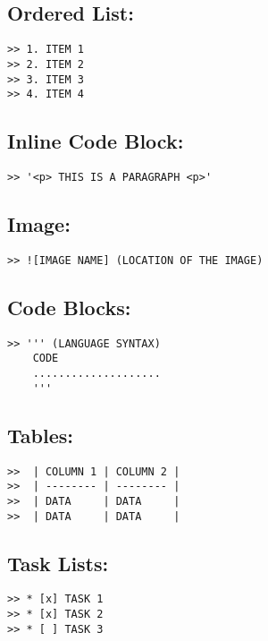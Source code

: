 \documentclass[british]{article}
\begin{document}
\subsection{Ordered List:}
\begin{verbatim}
>> 1. ITEM 1
>> 2. ITEM 2
>> 3. ITEM 3
>> 4. ITEM 4
\end{verbatim}

\subsection{Inline Code Block:}
\begin{verbatim}
>> '<p> THIS IS A PARAGRAPH <p>'
\end{verbatim}

\subsection{Image:}
\begin{verbatim}
>> ![IMAGE NAME] (LOCATION OF THE IMAGE)
\end{verbatim}

\subsection{Code Blocks:}
\begin{verbatim}
>> ''' (LANGUAGE SYNTAX)
	CODE 
	....................
	'''
\end{verbatim}

\subsection{Tables:}
\begin{verbatim}
>>  | COLUMN 1 | COLUMN 2 |
>>  | -------- | -------- |
>>  | DATA     | DATA     |
>>  | DATA     | DATA     |
\end{verbatim}

\subsection{Task Lists:}
\begin{verbatim}
>> * [x] TASK 1
>> * [x] TASK 2
>> * [ ] TASK 3
\end{verbatim}
\end{document}
